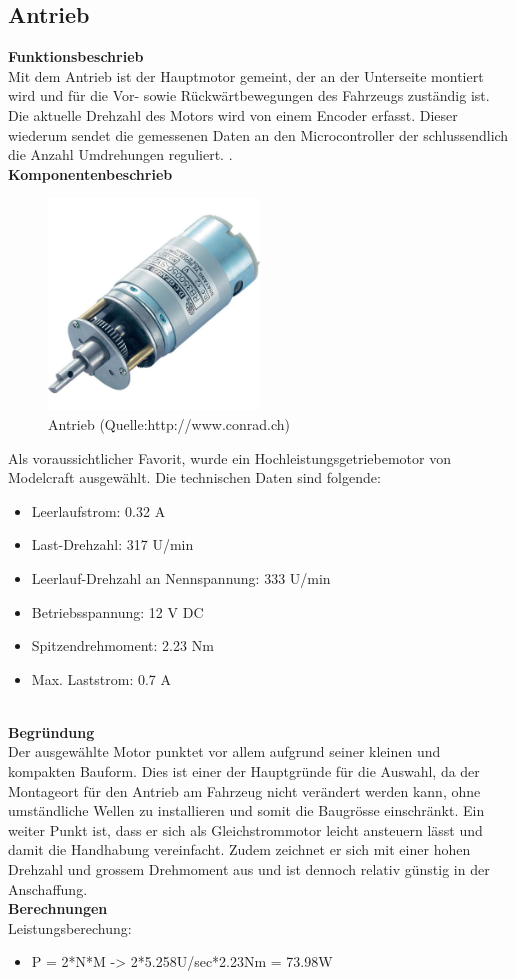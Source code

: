 \subsection{Antrieb}

\textbf{Funktionsbeschrieb}\\[0.2cm]
Mit dem Antrieb ist der Hauptmotor gemeint, der an der Unterseite montiert wird und für die Vor- sowie Rückwärtbewegungen des Fahrzeugs zuständig ist.
Die aktuelle Drehzahl des Motors wird von einem Encoder erfasst. Dieser wiederum sendet die gemessenen Daten an den Microcontroller der schlussendlich die Anzahl Umdrehungen reguliert.
.\\[0.2cm]
\textbf{Komponentenbeschrieb}
\begin{figure}[h]
\centering
\includegraphics[width=0.5\textwidth]{03_Loesungskonzept/pictures/antrieb.jpg}
\caption{Antrieb  (Quelle:http://www.conrad.ch)}	
\end{figure}
Als voraussichtlicher Favorit, wurde ein Hochleistungsgetriebemotor von Modelcraft ausgewählt. Die technischen Daten sind folgende:
\begin{itemize}
\item Leerlaufstrom: 0.32 A
\item Last-Drehzahl: 317 U/min
\item Leerlauf-Drehzahl an Nennspannung: 333 U/min
\item Betriebsspannung: 12 V DC
\item Spitzendrehmoment: 2.23 Nm
\item Max. Laststrom: 0.7 A
\end{itemize}\\[0.2cm]
\textbf{Begründung}\\[0.2cm]
Der ausgewählte Motor punktet vor allem aufgrund seiner kleinen und kompakten Bauform. Dies ist einer der Hauptgründe für die Auswahl, da der Montageort für den Antrieb am Fahrzeug nicht verändert werden kann, ohne umständliche Wellen zu installieren und somit die Baugrösse einschränkt.
Ein weiter Punkt ist, dass er sich als Gleichstrommotor leicht ansteuern lässt und damit die Handhabung vereinfacht.
Zudem zeichnet er sich mit einer hohen Drehzahl und grossem Drehmoment aus und ist dennoch relativ günstig in der Anschaffung.\\[0.2cm]
\textbf{Berechnungen}\\[0.2cm]
Leistungsberechung:
\begin{itemize}
\item P = 2*\pi*N*M -> 2*\pi*5.258U/sec*2.23Nm = 73.98W


\end{itemize}